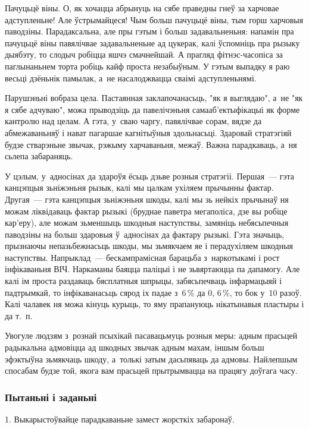 Пачуцьцё віны. О, як хочацца абрынуць на сябе праведны гнеў за харчовае адступленьне! Але ўстрымайцеся! Чым больш пачуцьцё віны, тым горш харчовыя паводзіны. Парадаксальна, але пры гэтым і больш задавальненьня: напамін пра пачуцьцё віны павялічвае задавальненьне ад цукерак, калі ўспомніць пра рызыку дыябэту, то слодыч робіцца яшчэ смачнейшай. А прагляд фітнэс-часопіса за паглынаньнем торта робіць кайф проста незабыўным. У гэтым выпадку я раю весьці дзёньнік памылак, а~не насалоджвацца сваімі адступленьнямі.

Парушэньні вобраза цела. Пастаянная заклапочанасьць, "як я выглядаю", а~не "як я сябе адчуваю", можа прыводзіць да павелічэньня самааб'ектыфікацыі як форме кантролю над целам. А гэта, у~сваю чаргу, павялічвае сорам, вядзе да абмежаваньняў і нават пагаршае кагнітыўныя здольнасьці. Здаровай стратэгіяй будзе стварэньне звычак, рэжыму харчаваньня, межаў. Важна парадкаваць, а~ня сьлепа забараняць.

У цэлым, у~адносінах да здароўя ёсьць дзьве розныя стратэгіі. Першая~--- гэта канцэпцыя зьніжэньня рызык, калі мы цалкам ухіляем прычынны фактар. Другая~--- гэта канцэпцыя зьніжэньня шкоды, калі мы зь нейкіх прычынаў ня можам ліквідаваць фактар рызыкі (бруднае паветра мегаполіса, дзе вы робіце кар'еру), але можам зьменшыць шкодныя наступствы, замяніць небясьпечныя паводзіны на больш здаровыя ў~адносінах да фактару рызыкі. Гэта значыць, прызнаючы непазьбежнасьць шкоды, мы зьмякчаем яе і перадухіляем шкодныя наступствы. Напрыклад~--- бескампрамісная барацьба з~наркотыкамі і рост інфікаваньня ВІЧ. Наркаманы баяцца паліцыі і не зьвяртаюцца па дапамогу. Але калі ім проста раздаваць бясплатныя шпрыцы, забясьпечваць інфармацыяй і падтрымкай, то інфікаванасьць сярод іх падае з~6\,\% да 0, 6\,\%, то бок у~10 разоў. Калі чалавек ня можа кінуць курыць, то яму прапануюць нікатынавыя пластыры і да т.~п.

Увогуле людзям з~рознай псыхікай пасавацьмуць розныя меры: адным прасьцей радыкальна адмовіцца ад шкодных звычак адным махам, іншым больш эфэктыўна зьмякчаць шкоду, а~толькі затым дасьпяваць да адмовы. Найлепшым спосабам будзе той, якога вам прасьцей прытрымвацца на працягу доўгага часу.

\subsubsection{Пытаньні і заданьні}

1. Выкарыстоўвайце парадкаваньне замест жорсткіх забаронаў.

